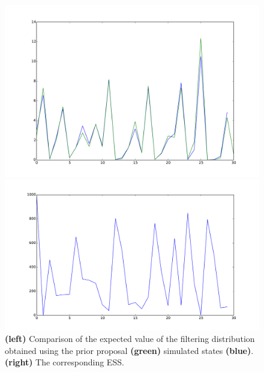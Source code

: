 \documentclass{article}
\begin{document}
\begin{figure}[htb]
	\centering
	\begin{minipage}{.45\textwidth}
		\centering
		\includegraphics[width=0.97\linewidth]{bootstrap-filter/diagno_gamma2.pdf}
	\end{minipage}
	\begin{minipage}{.45\textwidth}
		\centering
		\includegraphics[width=0.97\linewidth]{bootstrap-filter/ESS_gamma2.pdf}
	\end{minipage}
	\caption{\textbf{(left)} Comparison of the expected value of the filtering distribution obtained using the prior proposal \textbf{(green)} simulated states \textbf{(blue)}. \textbf{(right)} The corresponding ESS. }
	\label{fig:gamma2}
\end{figure}
\end{document}
